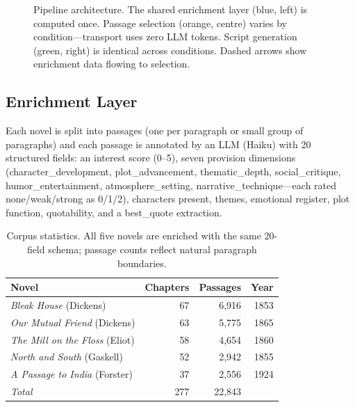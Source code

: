 \documentclass[final]{clv2025}
\begin{document}
\begin{figure}[t]
\caption{Pipeline architecture.  The shared enrichment layer (blue,
  left) is computed once.  Passage selection (orange, centre) varies by
  condition---transport uses zero LLM tokens.  Script generation
  (green, right) is identical across conditions.  Dashed arrows show
  enrichment data flowing to selection.}
\label{fig:pipeline}
\end{figure}


\subsection{Enrichment Layer}
\label{sec:enrichment}

Each novel is split into passages (one per paragraph or small group of
paragraphs) and each passage is annotated by an LLM (Haiku) with 20
structured fields: an interest score (0--5), seven provision dimensions
(character\_development, plot\_advancement, thematic\_depth,
social\_critique, humor\_entertainment, atmosphere\_setting,
narrative\_technique---each rated none/weak/strong as 0/1/2),
characters present, themes, emotional register, plot function,
quotability, and a best\_quote extraction.

\begin{table}[t]
\caption{Corpus statistics.  All five novels are enriched with the
  same 20-field schema; passage counts reflect natural paragraph
  boundaries.}
\label{tab:corpus}
\begin{tabular}{lrrr}
\toprule
Novel & Chapters & Passages & Year \\
\midrule
\textit{Bleak House} (Dickens)        & 67 & 6{,}916 & 1853 \\
\textit{Our Mutual Friend} (Dickens)  & 63 & 5{,}775 & 1865 \\
\textit{The Mill on the Floss} (Eliot) & 58 & 4{,}654 & 1860 \\
\textit{North and South} (Gaskell)    & 52 & 2{,}942 & 1855 \\
\textit{A Passage to India} (Forster) & 37 & 2{,}556 & 1924 \\
\midrule
\textit{Total}                         & 277 & 22{,}843 & \\
\bottomrule
\end{tabular}
\end{table}
\end{document}
